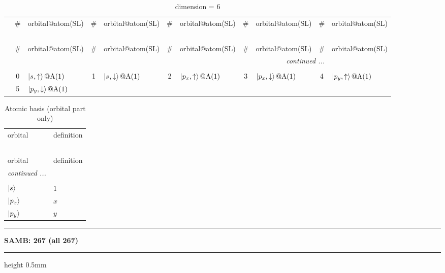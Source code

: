 \documentclass[fleqn,10pt,landscape]{jsarticle}
\begin{document}
\renewcommand{\arraystretch}{1.6}
\begin{longtable}[l]{c|cl|cl|cl|cl|cl}
\captionsetup{justification=raggedright, singlelinecheck=off}
\caption{dimension = 6}
 \\
 \hline \hline
 & \# & orbital@atom(SL) & \# & orbital@atom(SL) & \# & orbital@atom(SL) & \# & orbital@atom(SL) & \# & orbital@atom(SL) \\ \hline \endfirsthead

\multicolumn{10}{l}{\tablename\ \thetable{}} \\
 \hline \hline
 & \# & orbital@atom(SL) & \# & orbital@atom(SL) & \# & orbital@atom(SL) & \# & orbital@atom(SL) & \# & orbital@atom(SL) \\ \hline \endhead

 \hline \hline
\multicolumn{10}{r}{\footnotesize\it continued ...} \\ \endfoot

 \hline \hline
\multicolumn{10}{r}{} \\ \endlastfoot

 & 0 & $\ket{s_{},\uparrow}@{\rm A}(1)$ & 1 & $\ket{s_{},\downarrow}@{\rm A}(1)$ & 2 & $\ket{p_{x},\uparrow}@{\rm A}(1)$ & 3 & $\ket{p_{x},\downarrow}@{\rm A}(1)$ & 4 & $\ket{p_{y},\uparrow}@{\rm A}(1)$ \\
& 5 & $\ket{p_{y},\downarrow}@{\rm A}(1)$ &  &  &  &  &  &  &  &  \\
\end{longtable}
\renewcommand{\arraystretch}{1.6}
\begin{longtable}[l]{ll}
\captionsetup{justification=raggedright, singlelinecheck=off}
\caption{Atomic basis (orbital part only)}
 \\
 \hline \hline
orbital & definition \\ \hline \endfirsthead

\multicolumn{1}{l}{\tablename\ \thetable{}} \\
 \hline \hline
orbital & definition \\ \hline \endhead

 \hline \hline
\multicolumn{1}{r}{\footnotesize\it continued ...} \\ \endfoot

 \hline \hline
\multicolumn{1}{r}{} \\ \endlastfoot

$ \ket{s} $ & $ 1 $ \\ \hline
$ \ket{p_{x}} $ & $ x $ \\
$ \ket{p_{y}} $ & $ y $ \\
\end{longtable}
\vspace{5mm}
\noindent \rule[0.5mm]{5mm}{0.5mm}\hspace{3mm}\textbf{SAMB: 267 (all 267)}\hspace{3mm}\leaders\hrule height 0.5mm\hfill\kern0pt
\vspace{3mm}
\end{document}
